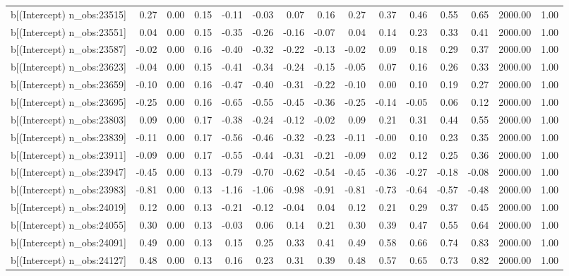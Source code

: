 \begin{table}[ht]
\begin{tabular}{rrrrrrrrrrrrrrr}
  b[(Intercept) n\_obs:23515] & 0.27 & 0.00 & 0.15 & -0.11 & -0.03 & 0.07 & 0.16 & 0.27 & 0.37 & 0.46 & 0.55 & 0.65 & 2000.00 & 1.00 \\ 
  b[(Intercept) n\_obs:23551] & 0.04 & 0.00 & 0.15 & -0.35 & -0.26 & -0.16 & -0.07 & 0.04 & 0.14 & 0.23 & 0.33 & 0.41 & 2000.00 & 1.00 \\ 
  b[(Intercept) n\_obs:23587] & -0.02 & 0.00 & 0.16 & -0.40 & -0.32 & -0.22 & -0.13 & -0.02 & 0.09 & 0.18 & 0.29 & 0.37 & 2000.00 & 1.00 \\ 
  b[(Intercept) n\_obs:23623] & -0.04 & 0.00 & 0.15 & -0.41 & -0.34 & -0.24 & -0.15 & -0.05 & 0.07 & 0.16 & 0.26 & 0.33 & 2000.00 & 1.00 \\ 
  b[(Intercept) n\_obs:23659] & -0.10 & 0.00 & 0.16 & -0.47 & -0.40 & -0.31 & -0.22 & -0.10 & 0.00 & 0.10 & 0.19 & 0.27 & 2000.00 & 1.00 \\ 
  b[(Intercept) n\_obs:23695] & -0.25 & 0.00 & 0.16 & -0.65 & -0.55 & -0.45 & -0.36 & -0.25 & -0.14 & -0.05 & 0.06 & 0.12 & 2000.00 & 1.00 \\ 
  b[(Intercept) n\_obs:23803] & 0.09 & 0.00 & 0.17 & -0.38 & -0.24 & -0.12 & -0.02 & 0.09 & 0.21 & 0.31 & 0.44 & 0.55 & 2000.00 & 1.00 \\ 
  b[(Intercept) n\_obs:23839] & -0.11 & 0.00 & 0.17 & -0.56 & -0.46 & -0.32 & -0.23 & -0.11 & -0.00 & 0.10 & 0.23 & 0.35 & 2000.00 & 1.00 \\ 
  b[(Intercept) n\_obs:23911] & -0.09 & 0.00 & 0.17 & -0.55 & -0.44 & -0.31 & -0.21 & -0.09 & 0.02 & 0.12 & 0.25 & 0.36 & 2000.00 & 1.00 \\ 
  b[(Intercept) n\_obs:23947] & -0.45 & 0.00 & 0.13 & -0.79 & -0.70 & -0.62 & -0.54 & -0.45 & -0.36 & -0.27 & -0.18 & -0.08 & 2000.00 & 1.00 \\ 
  b[(Intercept) n\_obs:23983] & -0.81 & 0.00 & 0.13 & -1.16 & -1.06 & -0.98 & -0.91 & -0.81 & -0.73 & -0.64 & -0.57 & -0.48 & 2000.00 & 1.00 \\ 
  b[(Intercept) n\_obs:24019] & 0.12 & 0.00 & 0.13 & -0.21 & -0.12 & -0.04 & 0.04 & 0.12 & 0.21 & 0.29 & 0.37 & 0.45 & 2000.00 & 1.00 \\ 
  b[(Intercept) n\_obs:24055] & 0.30 & 0.00 & 0.13 & -0.03 & 0.06 & 0.14 & 0.21 & 0.30 & 0.39 & 0.47 & 0.55 & 0.64 & 2000.00 & 1.00 \\ 
  b[(Intercept) n\_obs:24091] & 0.49 & 0.00 & 0.13 & 0.15 & 0.25 & 0.33 & 0.41 & 0.49 & 0.58 & 0.66 & 0.74 & 0.83 & 2000.00 & 1.00 \\ 
  b[(Intercept) n\_obs:24127] & 0.48 & 0.00 & 0.13 & 0.16 & 0.23 & 0.31 & 0.39 & 0.48 & 0.57 & 0.65 & 0.73 & 0.82 & 2000.00 & 1.00 \\ 

\end{tabular}
\end{table}
